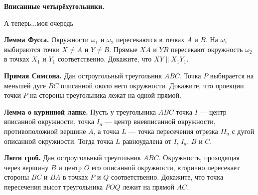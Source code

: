 \newpage

\hspace{3mm}

\centerline{\bf \Huge Вписанные четырёхугольники.}

\begin{flushright}
        \scriptsize{А теперь...моя очередь}
\end{flushright}

\textbf{Лемма Фусса.} Окружности \( \omega_1 \) и \( \omega_2 \) пересекаются в точках \( A \) и \( B \). На \( \omega_1 \) выбираются точки \( X \neq A \) и \( Y \neq B \). Прямые \( XA \) и \( YB \) пересекают окружность \( \omega_2 \) в точках \( X_1 \) и \( Y_1 \) соответственно. Докажите, что \( XY \parallel X_1 Y_1 \).

\textbf{Прямая Симсона.} Дан остроугольный треугольник \( ABC \). Точка \( P \) выбирается на меньшей дуге \( BC \) описанной около него окружности. Докажите, что проекции точки \( P \) на стороны треугольника лежат на одной прямой.

\textbf{Лемма о куринной лапке.} Пусть у треугольника \( ABC \) точка \( I \) — центр вписанной окружности, точка \( I_a \) — центр вневписанной окружности, противоположной вершине \( A \), а точка \( L \) — точка пересечения отрезка \( II_a \) с дугой описанной окружности. Тогда точка \( L \) равноудалена от \( I \), \( I_a \), \( B \) и \( C \).

\textbf{Люти гроб.} Дан остроугольный треугольник $ABC$. Окружность, проходящая через вершину $B$ и центр $O$ его описанной окружности, вторично пересекает стороны $BC$ и $BA$ в точках $P$ и $Q$ соответственно. Докажите, что точка пересечения высот треугольника $POQ$ лежит на прямой $AC$.